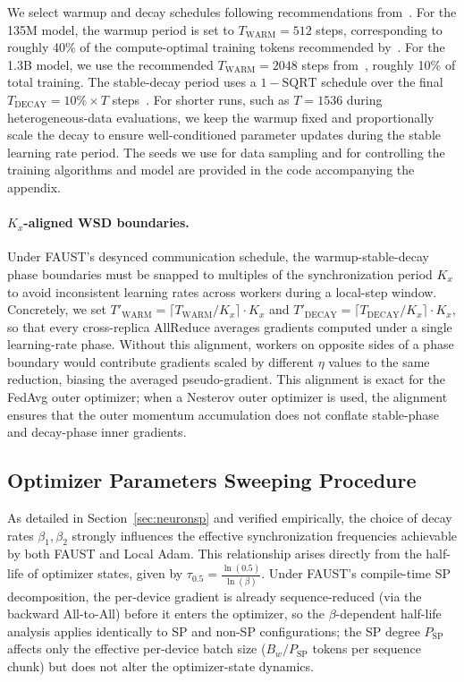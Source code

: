 \documentclass{article}
\begin{document}
We select warmup and decay schedules following recommendations from~\citet{merrill2025criticalbatchsizerevisited,hagele2024scaling,allal2025smollm2}. For the 135M model, the warmup period is set to $T_{\text{WARM}} = 512$
steps, corresponding to roughly 40\% of the compute-optimal training tokens recommended by~\citet{merrill2025criticalbatchsizerevisited}. For the 1.3B model, we use the recommended $T_{\text{WARM}} = 2048$ steps from~\citet{allal2025smollm2}, roughly 10\% of total training. The stable-decay period uses a $1 - \text{SQRT}$ schedule over
the final $T_{\text{DECAY}} = 10\% \times T$ steps~\citep{hagele2024scaling}. For shorter runs, such as $T = 1536$ during heterogeneous-data evaluations, we keep the warmup fixed and proportionally scale the decay to ensure well-conditioned parameter updates during the stable learning rate period. The seeds we use for data sampling and for controlling the training algorithms and model are provided in the code accompanying the appendix.

\paragraph{$K_x$-aligned WSD boundaries.}
Under FAUST's desynced communication schedule, the warmup-stable-decay phase boundaries
must be snapped to multiples of the synchronization period $K_x$ to avoid inconsistent
learning rates across workers during a local-step window.
Concretely, we set $T'_{\text{WARM}} = \lceil T_{\text{WARM}} / K_x \rceil \cdot K_x$ and
$T'_{\text{DECAY}} = \lceil T_{\text{DECAY}} / K_x \rceil \cdot K_x$, so that every
cross-replica AllReduce averages gradients computed under a single learning-rate phase.
Without this alignment, workers on opposite sides of a phase boundary would contribute
gradients scaled by different $\eta$ values to the same reduction, biasing the averaged
pseudo-gradient.
This alignment is exact for the FedAvg outer optimizer; when a Nesterov outer optimizer is
used, the alignment ensures that the outer momentum accumulation
does not conflate stable-phase and decay-phase inner gradients.

\subsection{Optimizer Parameters Sweeping Procedure}
\label{sec:sweep}

As detailed in Section~\ref{sec:neuronsp} and verified empirically, the choice of decay rates $\beta_1, \beta_2$
strongly influences the effective synchronization frequencies achievable by both FAUST and
Local Adam. This relationship arises directly from the half-life of optimizer states, given by
$\tau_{0.5} = \frac{\ln(0.5)}{\ln(\beta)}$.
Under FAUST's compile-time SP decomposition, the per-device gradient is already
sequence-reduced (via the backward All-to-All) before it enters the optimizer, so the
$\beta$-dependent half-life analysis applies identically to SP and non-SP configurations;
the SP degree $P_{\text{SP}}$ affects only the effective per-device batch size
($B_w / P_{\text{SP}}$ tokens per sequence chunk) but does not alter the optimizer-state
dynamics.
\end{document}
